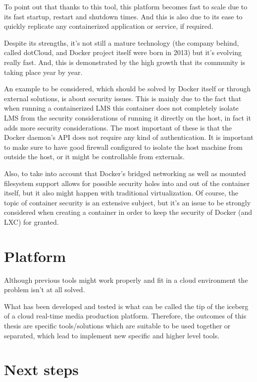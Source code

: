 To point out that thanks to this tool, this platform becomes fast to scale due to its fast startup, restart and shutdown times. And this is also due to its ease to quickly replicate any containerized application or service, if required. 

Despite its strengths, it's not still a mature technology (the company behind, called dotCloud, and Docker project itself were born in 2013) but it's evolving really fast. And, this is demonstrated by the high growth that its community is taking place year by year. 

An example to be considered, which should be solved by Docker itself or through external solutions, is about security issues. This is mainly due to the fact that when running a containerized LMS this container does not completely isolate LMS from the security considerations of running it directly on the host, in fact it adds more security considerations. The most important of these is that the Docker daemon's API does not require any kind of authentication. It is important to make sure to have good firewall configured to isolate the host machine from outside the host, or it might be controllable from externals. 

Also, to take into account that Docker's bridged networking as well as mounted filesystem support allows for possible security holes into and out of the container itself, but it also might happen with traditional virtualization. Of course, the topic of container security is an extensive subject, but it's an issue to be strongly considered when creating a container in order to keep the security of Docker (and LXC) for granted.

\section{Platform}

Although previous tools might work properly and fit in a cloud environment the problem isn't at all solved. 

What has been developed and tested is what can be called the tip of the iceberg of a cloud real-time media production platform. Therefore, the outcomes of this thesis are specific tools/solutions which are suitable to be used together or separated, which lead to implement new specific and higher level tools. 


\section{Next steps}

